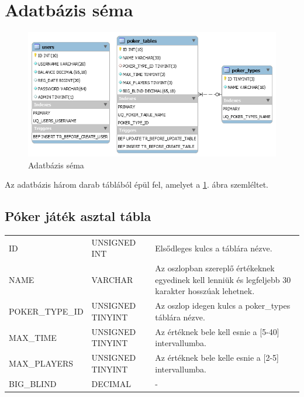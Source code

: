 \section{Adatbázis séma}
\begin{figure}[h!]
  \caption{Adatbázis séma}
  \label{fig:db_scheme}
  \centering
    \includegraphics[width=\textwidth]{user-documentation/images/db_scheme2.png}
\end{figure}
Az adatbázis három darab táblából épül fel, amelyet a \ref{fig:db_scheme}. ábra szemléltet.

\subsection{Póker játék asztal tábla}
\begin{tabular}{| C{4.7cm} | C{4.7cm} | C{4.7cm} |}
\hline
   &  &  \\ \hline
  ID & UNSIGNED INT & Elsődleges kulcs a táblára nézve. \\ \hline
  NAME & VARCHAR & Az oszlopban szereplő értékeknek egyedinek kell lenniük és legfeljebb 30 karakter hosszúak lehetnek.  \\ \hline
  POKER\_TYPE\_ID & UNSIGNED TINYINT & Az oszlop idegen kulcs a poker\_types táblára nézve. \\ \hline
  MAX\_TIME & UNSIGNED TINYINT & Az értéknek bele kell esnie a [5-40] intervallumba. \\ \hline
  MAX\_PLAYERS & UNSIGNED TINYINT & Az értéknek bele kelle esnie a [2-5] intervallumba. \\ \hline
  BIG\_BLIND & DECIMAL & - \\ \hline
\end{tabular}

